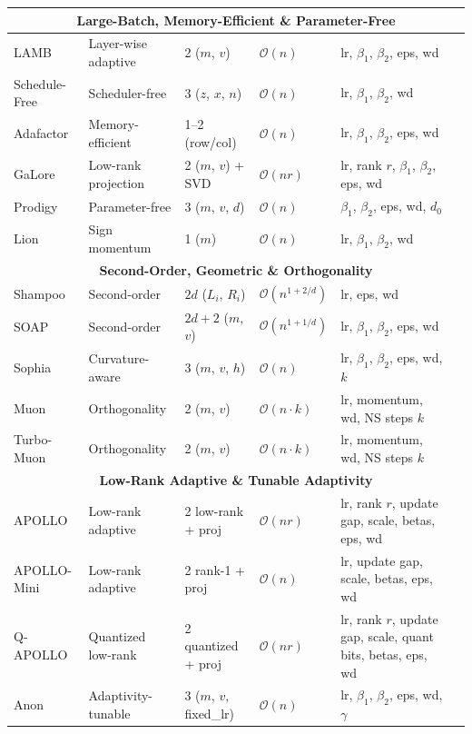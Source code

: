 \begin{longtable}{p{2.0cm}p{2.0cm}p{2.2cm}p{2.0cm}p{3.8cm}p{2.5cm}}
\multicolumn{6}{c}{\textbf{Large-Batch, Memory-Efficient \& Parameter-Free}} \\
\midrule
LAMB & Layer-wise adaptive & 2 ($m$, $v$) & $\mathcal{O}(n)$ & lr, $\beta_1$, $\beta_2$, eps, wd & \citep{you_largebatch_2020} \\
Schedule-Free & Scheduler-free & 3 ($z$, $x$, $n$) & $\mathcal{O}(n)$ & lr, $\beta_1$, $\beta_2$, wd & \citep{defazio_road_2024} \\
Adafactor & Memory-efficient & 1--2 (row/col) & $\mathcal{O}(n)$ & lr, $\beta_1$, $\beta_2$, eps, wd & \citep{shazeer_adafactor_2018} \\
GaLore & Low-rank projection & 2 ($m$, $v$) + SVD & $\mathcal{O}(n r)$ & lr, rank $r$, $\beta_1$, $\beta_2$, eps, wd & \citep{zhao_galore_2024} \\
Prodigy & Parameter-free & 3 ($m$, $v$, $d$) & $\mathcal{O}(n)$ & $\beta_1$, $\beta_2$, eps, wd, $d_0$ & \citep{mishchenko_prodigy_2023} \\
Lion & Sign momentum & 1 ($m$) & $\mathcal{O}(n)$ & lr, $\beta_1$, $\beta_2$, wd & \citep{chen_symbolic_2023} \\
\midrule

\multicolumn{6}{c}{\textbf{Second-Order, Geometric \& Orthogonality}} \\
\midrule
Shampoo & Second-order & $2d$ ($L_i$, $R_i$) & $\mathcal{O}(n^{1+2/d})$ & lr, eps, wd & \citep{gupta_shampoo_2018} \\
SOAP & Second-order & $2d + 2$ ($m$, $v$) & $\mathcal{O}(n^{1+1/d})$ & lr, $\beta_1$, $\beta_2$, eps, wd & \citep{vyas_soap_2024} \\
Sophia & Curvature-aware & 3 ($m$, $v$, $h$) & $\mathcal{O}(n)$ & lr, $\beta_1$, $\beta_2$, eps, wd, $k$ & \citep{liu_sophia_2023} \\
Muon & Orthogonality & 2 ($m$, $v$) & $\mathcal{O}(n \cdot k)$ & lr, momentum, wd, NS steps $k$ & \citep{shen_convergence_2025} \\
Turbo-Muon & Orthogonality & 2 ($m$, $v$) & $\mathcal{O}(n \cdot k)$ & lr, momentum, wd, NS steps $k$ & \citep{boissin_turbo-muon_2025} \\
\midrule

\multicolumn{6}{c}{\textbf{Low-Rank Adaptive \& Tunable Adaptivity}} \\
\midrule
APOLLO & Low-rank adaptive & 2 low-rank + proj & $\mathcal{O}(n r)$ & lr, rank $r$, update gap, scale, betas, eps, wd & \citep{zhu2025apollosgdlikememoryadamwlevel} \\
APOLLO-Mini & Low-rank adaptive & 2 rank-1 + proj & $\mathcal{O}(n)$ & lr, update gap, scale, betas, eps, wd & \citep{zhu2025apollosgdlikememoryadamwlevel} \\
Q-APOLLO & Quantized low-rank & 2 quantized + proj & $\mathcal{O}(n r)$ & lr, rank $r$, update gap, scale, quant bits, betas, eps, wd & \citep{zhu2025apollosgdlikememoryadamwlevel} \\
Anon & Adaptivity-tunable & 3 ($m$, $v$, fixed\_lr) & $\mathcal{O}(n)$ & lr, $\beta_1$, $\beta_2$, eps, wd, $\gamma$ & \citep{anon2026anon} \\
\bottomrule
\end{longtable}
\normalsize

